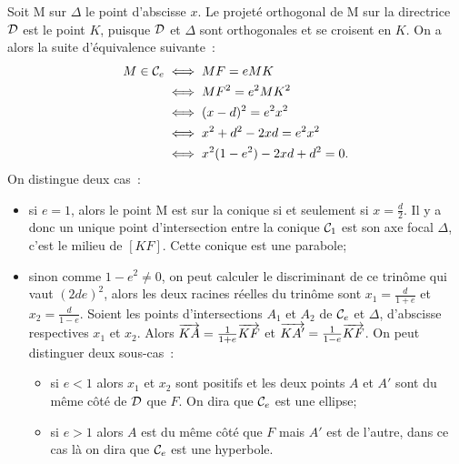 Soit M sur \(\Delta\) le point d'abscisse \(x\). Le projeté orthogonal de M sur
la directrice \(\mathcal{D}\) est le point \(K\), puisque \(\mathcal{D}\) et \(\Delta\) sont
orthogonales et se croisent en \(K\). On a alors la suite d'équivalence
suivante~:
\begin{align}
  M \in \mathcal{C}_{e} &\iff MF = e MK \\
                &\iff MF^2 = e^2 MK^2 \\
                &\iff (x-d)^2 = e^2 x^2\\
                &\iff x^2 + d^2-2xd = e^2 x^2\\
                &\iff x^2(1-e^2)-2xd + d^2 = 0.
\end{align}
On distingue deux cas~:
\begin{itemize}
  \item si \(e = 1\), alors le point M est sur la conique si et seulement si
    \(x = \frac{d}{2}\). Il y a donc un unique point d'intersection entre la
    conique \(\mathcal{C}_{1}\) est son axe focal \(\Delta\), c'est le milieu de
    \([KF]\). Cette conique est une parabole;
  \item sinon comme \(1-e^2 \neq 0\), on peut calculer le discriminant de ce
    trinôme qui vaut \((2de)^2\), alors les deux racines réelles du trinôme sont
    \(x_1 = \frac{d}{1 + e}\) et \(x_2 = \frac{d}{1-e}\). Soient les points
    d'intersections \(A_1\) et \(A_2\) de \(\mathcal{C}_{e}\) et \(\Delta\), d'abscisse
    respectives \(x_1\) et \(x_2\). Alors \(\overrightarrow{KA} = \frac{1}{1 + e} \overrightarrow{KF}\)
    et \(\overrightarrow{KA'} = \frac{1}{1-e} \overrightarrow{KF}\). On peut distinguer deux
    sous-cas~:
    \begin{itemize}
      \item si \(e<1\) alors \(x_1\) et \(x_2\) sont positifs et les deux points
        \(A\) et \(A'\) sont du même côté de \(\mathcal{D}\) que \(F\). On dira que
        \(\mathcal{C}_{e}\) est une ellipse;
      \item si \(e>1\) alors \(A\) est du même côté que \(F\) mais \(A'\) est de
        l'autre, dans ce cas là on dira que \(\mathcal{C}_{e}\) est une hyperbole.
    \end{itemize}
\end{itemize}

